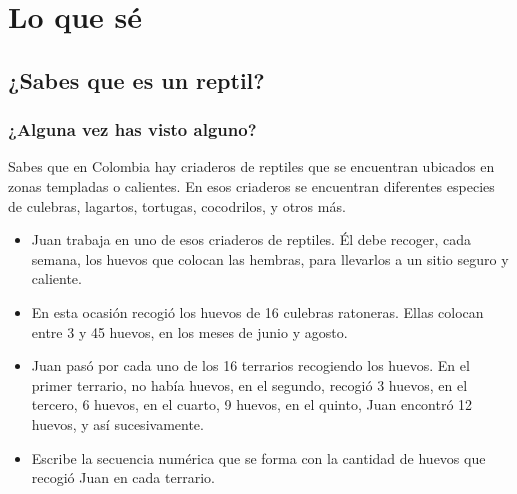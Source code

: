 \documentclass[10pt,twoside]{article}
\begin{document}
\section*{Lo que s\'{e}}
\subsection*{¿Sabes que es un reptil?}
\subsubsection*{¿Alguna vez has visto alguno?}
Sabes que en Colombia hay criaderos de reptiles que se
encuentran ubicados en zonas templadas o calientes. En esos
criaderos se encuentran diferentes especies de culebras, lagartos, tortugas, cocodrilos, y otros más.
\begin{itemize}
\item Juan trabaja en uno de esos criaderos de reptiles. Él debe recoger, cada semana, los huevos que colocan las hembras, para llevarlos a un sitio seguro y caliente.
\item En esta ocasión recogió los huevos de 16 culebras ratoneras. Ellas colocan entre 3 y 45 huevos, en los meses de junio y agosto.
\item Juan pasó por cada uno de los 16 terrarios recogiendo los huevos. En el primer terrario, no había huevos, en el segundo, recogió 3 huevos, en el tercero, 6 huevos, en el cuarto, 9 huevos, en el quinto, Juan encontró 12 huevos, y así sucesivamente.
\item Escribe la secuencia numérica que se forma con la cantidad de huevos que recogió Juan en cada terrario.
\end{itemize}
\end{document}
